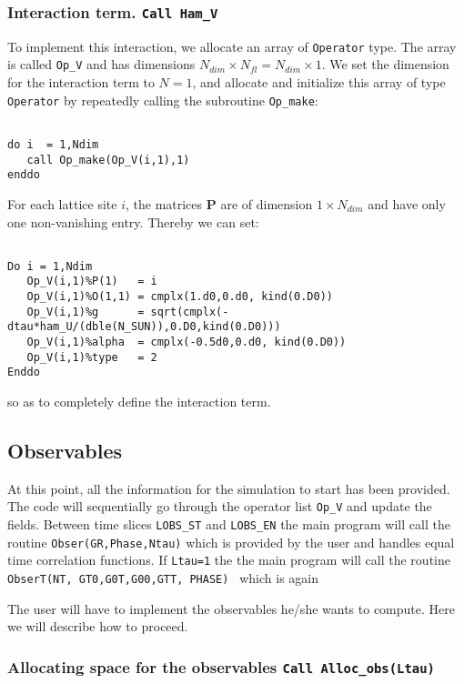 \subsubsection{Interaction term. \texttt{Call Ham\_V}}
To implement this interaction, we allocate an array of \texttt{Operator} type. The array is called  \texttt{Op\_V} and has dimensions $N_{dim}\times N_{fl}=N_{dim} \times 1$. 
We set the dimension for the interaction term to  $N=1$, and  allocate and initialize this array of type  \texttt{Operator} by repeatedly calling the subroutine \texttt{Op\_make}: 

\begin{lstlisting}

do i  = 1,Ndim
   call Op_make(Op_V(i,1),1)
enddo

\end{lstlisting}
For each lattice site $i$, the  matrices ${\bm P}$ are of dimension $1\times N_{dim} $ and have only one non-vanishing entry. Thereby we can set:

\begin{lstlisting}

Do i = 1,Ndim
   Op_V(i,1)%P(1)   = i
   Op_V(i,1)%O(1,1) = cmplx(1.d0,0.d0, kind(0.D0))
   Op_V(i,1)%g      = sqrt(cmplx(-dtau*ham_U/(dble(N_SUN)),0.D0,kind(0.D0)))
   Op_V(i,1)%alpha  = cmplx(-0.5d0,0.d0, kind(0.D0))
   Op_V(i,1)%type   = 2
Enddo

\end{lstlisting}
so as to completely define the interaction term. 

\subsection{Observables}
At this point, all the information   for the simulation to  start has been provided.  The code will sequentially go through  the operator list  \texttt{Op\_V}  and update the  fields.   Between  time slices   \texttt{LOBS\_ST}  and  \texttt{LOBS\_EN}   the main program will call the routine  \texttt{Obser(GR,Phase,Ntau)}   which is provided by the user and handles equal time correlation functions. 
If \texttt{Ltau=1} the the main program will call the routine \texttt{ObserT(NT,  GT0,G0T,G00,GTT, PHASE) }   which is again 


The user will have to  implement the  observables  he/she  wants to compute. Here  we  will describe how to  proceed. 

\subsubsection{Allocating space for the observables \texttt{Call Alloc\_obs(Ltau) }}

